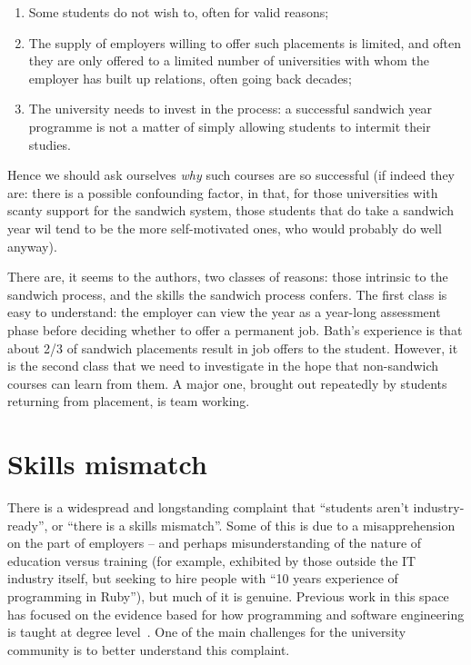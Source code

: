 \documentclass[sigconf,anonymous]{acmart}
\begin{document}
\begin{enumerate}
\item Some students do not wish to, often for valid reasons;
\item The supply of employers willing to offer such placements is
limited, and often they are only offered to a limited number of
universities with whom the employer has built up relations, often
going back decades;
\item The university needs to invest in the process: a successful
sandwich year programme is not a matter of simply allowing students to
intermit their studies.
\end{enumerate}

Hence we should ask ourselves \emph{why} such courses are so
successful (if indeed they are: there is a possible confounding
factor, in that, for those universities with scanty support for the
sandwich system, those students that do take a sandwich year wil tend
to be the more self-motivated ones, who would probably do well
anyway).

There are, it seems to the authors, two classes of reasons: those
intrinsic to the sandwich process, and the skills the sandwich process
confers. The first class is easy to understand: the employer can view
the year as a year-long assessment phase before deciding whether to
offer a permanent job. Bath's experience is that about 2/3 of sandwich
placements result in job offers to the student. However, it is the
second class that we need to investigate in the hope that non-sandwich
courses can learn from them. A major one, brought out repeatedly by
students returning from placement, is team working.

\section{Skills mismatch}\label{sec:Skills}

There is a widespread and longstanding complaint that ``students
aren't industry-ready'', or ``there is a skills mismatch''. Some of
this is due to a misapprehension on the part of employers -- and
perhaps misunderstanding of the nature of education versus training
(for example, exhibited by those outside the IT industry itself, but
seeking to hire people with ``10 years experience of programming in
Ruby''), but much of it is genuine. Previous work in this space has
focused on the evidence based for how programming and software
engineering is taught at degree
level~\cite{davenport-et-al:latice2016,murphy-et-al:programming2017,simon-et-al:sigcse2018}. One
of the main challenges for the university community is to better
understand this complaint.
\end{document}
